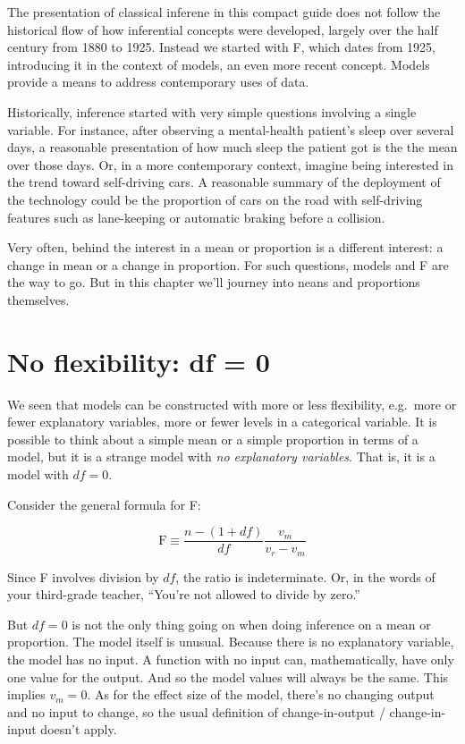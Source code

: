 \documentclass[]{tufte-book}
\begin{document}
The presentation of classical inferene in this compact guide does not follow the historical flow of how inferential concepts were developed, largely over the half century from 1880 to 1925. Instead we started with F, which dates from 1925, introducing it in the context of models, an even more recent concept. Models provide a means to address contemporary uses of data.

Historically, inference started with very simple questions involving a single variable. For instance, after observing a mental-health patient's sleep over several days, a reasonable presentation of how much sleep the patient got is the the mean over those days. Or, in a more contemporary context, imagine being interested in the trend toward self-driving cars. A reasonable summary of the deployment of the technology could be the proportion of cars on the road with self-driving features such as lane-keeping or automatic braking before a collision.

Very often, behind the interest in a mean or proportion is a different interest: a change in mean or a change in proportion. For such questions, models and F are the way to go. But in this chapter we'll journey into neans and proportions themselves.

\hypertarget{no-flexibility-df-0}{%
\section{No flexibility: df = 0}\label{no-flexibility-df-0}}

We seen that models can be constructed with more or less flexibility, e.g.~more or fewer explanatory variables, more or fewer levels in a categorical variable. It is possible to think about a simple mean or a simple proportion in terms of a model, but it is a strange model with \emph{no explanatory variables}. That is, it is a model with \(df = 0\).

Consider the general formula for F:

\[ \mbox{F} \equiv \frac{n - (1+df)}{df} \frac{v_m}{v_r - v_m}\]

Since F involves division by \(df\), the ratio is indeterminate. Or, in the words of your third-grade teacher, ``You're not allowed to divide by zero.''

But \(df=0\) is not the only thing going on when doing inference on a mean or proportion. The model itself is unusual. Because there is no explanatory variable, the model has no input. A function with no input can, mathematically, have only one value for the output. And so the model values will always be the same. This implies \(v_m = 0\). As for the effect size of the model, there's no changing output and no input to change, so the usual definition of change-in-output / change-in-input doesn't apply.
\end{document}
